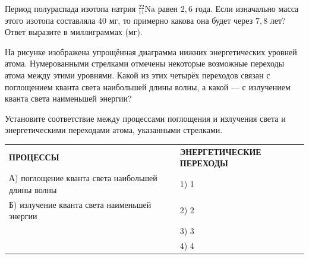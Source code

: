 \begin{taskbasic}[code={\label{task:nuclear_decay_sodium_remained}}]
Период полураспада изотопа натрия $^{22}_{11}\text{Na}$ равен $2{,}6\text{ года}$. Если изначально масса этого изотопа составляла $40\text{ мг}$, то примерно какова она будет через $7{,}8\text{ лет}$? Ответ выразите в миллиграммах (мг).

\end{taskbasic}

\begin{taskbasic}[code={\label{task:atomic_levels_max_lambda_min_e}}]
На рисунке изображена упрощённая диаграмма нижних энергетических уровней атома. Нумерованными стрелками отмечены некоторые возможные переходы атома между этими уровнями. Какой из этих четырёх переходов связан с поглощением кванта света наибольшей длины волны, а какой --- с излучением кванта света наименьшей энергии?

Установите соответствие между процессами поглощения и излучения света и энергетическими переходами атома, указанными стрелками.

\nopagebreak\smallskip
\begin{center}
\end{center}

\smallskip
\begin{tabular}{p{}p{}}
\textbf{ПРОЦЕССЫ} & \textbf{ЭНЕРГЕТИЧЕСКИЕ ПЕРЕХОДЫ} \\
А) поглощение кванта света наибольшей длины волны & 1) 1 \\
Б) излучение кванта света наименьшей энергии & 2) 2 \\
& 3) 3 \\
& 4) 4
\end{tabular}

\end{taskbasic}

